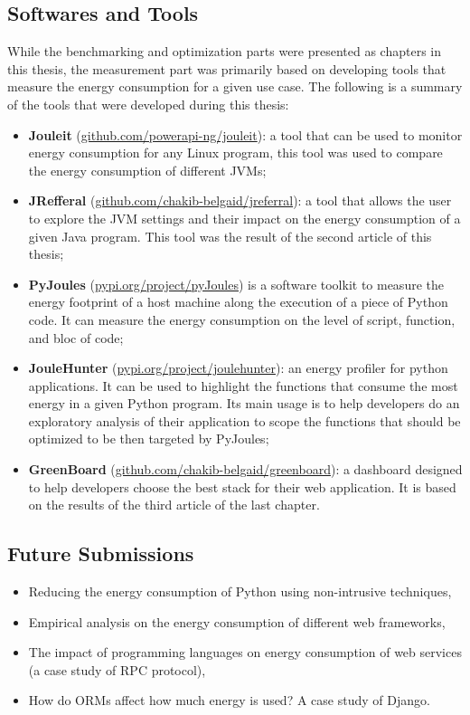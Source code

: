 \begin{enumerate}
\end{enumerate}

\subsection{Softwares and Tools}
While the benchmarking and optimization parts were presented as chapters in this thesis, the measurement part was primarily based on developing tools that measure the energy consumption for a given use case.
The following is a summary of the tools that were developed during this thesis:
\begin{itemize}
      \item \textbf{Jouleit} (\url{github.com/powerapi-ng/jouleit}): a tool that can be used to monitor energy consumption for any Linux program, this tool was used to compare the energy consumption of different JVMs;
      \item \textbf{JRefferal} (\url{github.com/chakib-belgaid/jreferral}): a tool that allows the user to explore the JVM settings and their impact on the energy consumption of a given Java program. This tool was the result of the second article of this thesis;
      \item \textbf{PyJoules} (\url{pypi.org/project/pyJoules}) is a software toolkit to measure the energy footprint of a host machine along the execution of a piece of Python code. It can measure the energy consumption on the level of script, function, and bloc of code;
      \item \textbf{JouleHunter} (\url{pypi.org/project/joulehunter}): an energy profiler for python applications. It can be used to highlight the functions that consume the most energy in a given Python program. Its main usage is to help developers do an exploratory analysis of their application to scope the functions that should be optimized to be then targeted by PyJoules;
      \item \textbf{GreenBoard} (\url{github.com/chakib-belgaid/greenboard}): a dashboard designed to help developers choose the best stack for their web application. It is based on the results of the third article of the last chapter.
\end{itemize}



\subsection{Future Submissions}
\begin{itemize}
      \item Reducing the energy consumption of Python using non-intrusive techniques,
      \item Empirical analysis on the energy consumption of different web frameworks,
      \item The impact of programming languages on energy consumption of web services (a case study of RPC protocol),
      \item How do ORMs affect how much energy is used? A case study of Django.
\end{itemize}


